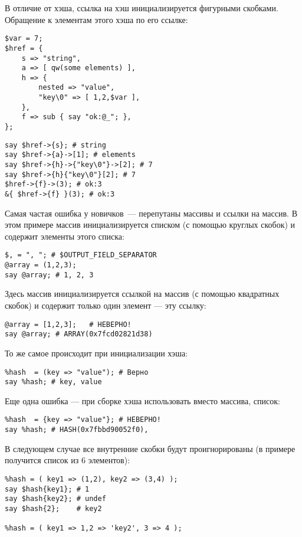 В отличие от хэша, ссылка на хэш инициализируется фигурными скобками. Обращение к элементам этого хэша по его ссылке:
\begin{verbatim}
$var = 7;
$href = {
    s => "string",
    a => [ qw(some elements) ],
    h => {
        nested => "value",
        "key\0" => [ 1,2,$var ],
    },
    f => sub { say "ok:@_"; },
};
\end{verbatim}

\begin{verbatim}
say $href->{s}; # string
say $href->{a}->[1]; # elements
say $href->{h}->{"key\0"}->[2]; # 7
say $href->{h}{"key\0"}[2]; # 7
$href->{f}->(3); # ok:3
&{ $href->{f} }(3); # ok:3
\end{verbatim}

Самая частая ошибка у новичков~--- перепутаны массивы и ссылки на массив. В этом примере массив инициализируется списком (с помощью круглых скобок) и содержит элементы этого списка:
\begin{verbatim}
$, = ", "; # $OUTPUT_FIELD_SEPARATOR
@array = (1,2,3);
say @array; # 1, 2, 3
\end{verbatim}
Здесь массив инициализируется ссылкой на массив (с помощью квадратных скобок) и содержит только один элемент --- эту ссылку:
\begin{verbatim}
@array = [1,2,3];   # НЕВЕРНО!
say @array; # ARRAY(0x7fcd02821d38)
\end{verbatim}

То же самое происходит при инициализации хэша:
\begin{verbatim}
%hash  = (key => "value"); # Верно
say %hash; # key, value
\end{verbatim}
Еще одна ошибка --- при сборке хэша использовать вместо массива, список:
\begin{verbatim}
%hash  = {key => "value"}; # НЕВЕРНО!
say %hash; # HASH(0x7fbbd90052f0),
\end{verbatim}
В следующем случае все внутренние скобки будут проигнорированы (в примере получится список из 6 элементов):
\begin{verbatim}
%hash = ( key1 => (1,2), key2 => (3,4) );
say $hash{key1}; # 1
say $hash{key2}; # undef
say $hash{2};    # key2

%hash = ( key1 => 1,2 => 'key2', 3 => 4 );
\end{verbatim}

